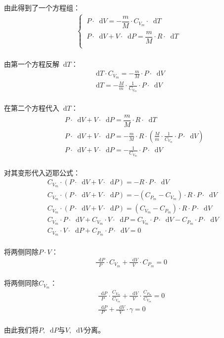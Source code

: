 \documentclass[UTF8]{ctexart}
\newcommand*{\dif}{\mathop{}\!\mathrm{d}}
\begin{document}
    由此得到了一个方程组：
    \begin{align}
        \begin{cases}
            ~P\cdot\dif V=-\dfrac{m}{M}\cdot C_{V_m}\cdot\dif T\\[2mm]
            ~P\cdot\dif V+V\cdot\dif P=\dfrac{m}{M}\cdot R\cdot \dif T\\[2mm]
        \end{cases}
    \end{align}\\
    由第一个方程反解$\dif T$：
    \begin{align}
        &\dif T\cdot C_{V_m}=-\frac{m}{M}\cdot P\cdot\dif V~~~~\\[3mm]
        &\dif T=-\frac{M}{m}\cdot\frac{1}{C_{V_m}}\cdot P\cdot\dif V
    \end{align}\\
    在第二个方程代入$\dif T$：
    \begin{align}
        &~~~~P\cdot\dif V+V\cdot\dif P=\dfrac{m}{M}\cdot R\cdot \dif T\\[3mm]
        &~~~~P\cdot\dif V+V\cdot\dif P=-\frac{m}{M}\cdot R\cdot\left(\frac{M}{m}\cdot\frac{1}{C_{V_m}}\cdot P\cdot\dif V\right)\\[3mm]
        &~~~~P\cdot\dif V+V\cdot\dif P=-\frac{1}{C_{V_m}}\cdot P\cdot\dif V
    \end{align}\\
    对其变形代入迈耶公式：
    \begin{align}
        &~~C_{V_m}\cdot(P\cdot\dif V+V\cdot\dif P)=-R\cdot P\cdot\dif V\\[3mm]
        &~~C_{V_m}\cdot(P\cdot\dif V+V\cdot\dif P)=-(C_{P_m}-C_{V_m})\cdot R\cdot P\cdot\dif V\\[3mm]
        &~~C_{V_m}\cdot(P\cdot\dif V+V\cdot\dif P)=(C_{V_m}-C_{P_m})\cdot R\cdot P\cdot\dif V\\[3mm]
        &~~C_{V_m}\cdot P\cdot\dif V+C_{V_m}\cdot V\cdot\dif P=C_{V_m}\cdot P\cdot\dif V-C_{P_m}\cdot P\cdot\dif V\\[3mm]
        &~~C_{V_m}\cdot V\cdot\dif P+C_{P_m}\cdot P\cdot\dif V=0
    \end{align}\\
    将两侧同除$P\cdot V$：
    \begin{align}
        &\frac{\dif P}{P}\cdot C_{V_m}+\frac{\dif V}{V}\cdot C_{P_m}=0
    \end{align}\\
    将两侧同除$C_{V_m}$：
    \begin{align}
        &\frac{\dif P}{P}\cdot\frac{C_{V_m}}{C_{V_m}}+\frac{\dif V}{V}\cdot\frac{C_{P_m}}{C_{V_m}}=0\\[3mm]
        &\frac{\dif P}{P}+\frac{\dif V}{V}\cdot\gamma=0
    \end{align}\\
    由此我们将$P,\dif P$与$V,\dif V$分离。
\end{document}
